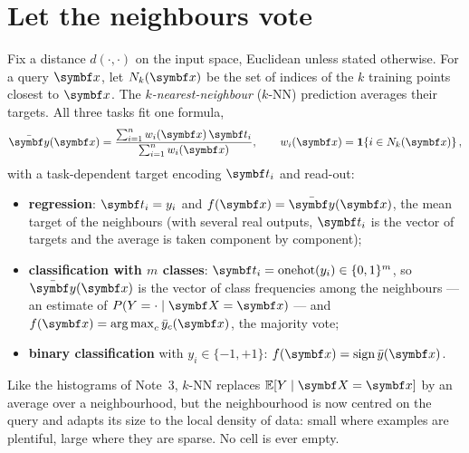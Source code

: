 \documentclass[11pt]{article}
\begin{document}

\section{Let the neighbours vote}\label{sec:knn}

Fix a distance $d(\cdot,\cdot)$ on the input space, Euclidean unless stated otherwise. For a query $\x$, let
$N_k(\x)$ be the set of indices of the $k$ training points closest to $\x$. The \emph{$k$-nearest-neighbour} ($k$-NN)
prediction averages their targets. All three tasks fit one formula,
\begin{equation}\label{eq:weighted}
  \bar{\vect{y}}(\x) = \frac{\sum_{i=1}^n w_i(\x)\, \vect{t}_i}{\sum_{i=1}^n w_i(\x)}, \qquad
  w_i(\x) = \ind{i \in N_k(\x)},
\end{equation}
with a task-dependent target encoding $\vect{t}_i$ and read-out:
\begin{itemize}
\item \textbf{regression}: $\vect{t}_i = y_i$ and $f(\x) = \bar{\vect{y}}(\x)$, the mean target of the neighbours
(with several real outputs, $\vect{t}_i$ is the vector of targets and the average is taken component by component);
\item \textbf{classification with $m$ classes}: $\vect{t}_i = \mathrm{onehot}(y_i) \in \{0,1\}^m$, so
$\bar{\vect{y}}(\x)$ is the vector of class frequencies among the neighbours --- an estimate of $P(Y = \cdot \mid
\X = \x)$ --- and $f(\x) = \argmax_c \bar y_c(\x)$, the majority vote;
\item \textbf{binary classification} with $y_i \in \{-1, +1\}$: $f(\x) = \operatorname{sign} \bar y(\x)$.
\end{itemize}
Like the histograms of Note~3, $k$-NN replaces $\E[Y \mid \X = \x]$ by an average over a neighbourhood, but the
neighbourhood is now centred on the query and adapts its size to the local density of data: small where examples are
plentiful, large where they are sparse. No cell is ever empty.
\end{document}
